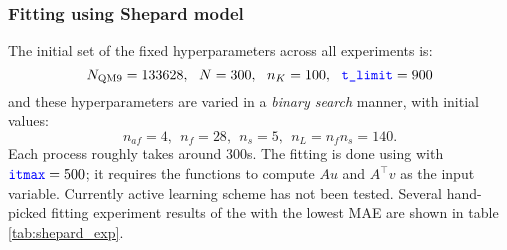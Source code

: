\documentclass[12pt]{article}
\begin{document}
\subsubsection{Fitting using Shepard model}
\label{subsubsec:shepard}
The initial set of the fixed hyperparameters across all experiments is:
\begin{equation*}
	N_\text{QM9} = 133628, ~~ N = 300,~~ n_K = 100, ~~\codeword{t_limit} = 900
\end{equation*}
and these hyperparameters are varied in a \textit{binary search} manner, with initial values:
\begin{equation*}
	n_{af} = 4,~~ n_f = 28, ~~ n_s = 5, ~~ n_L = n_fn_s = 140.
\end{equation*}
Each  process roughly takes around 300s. 
The fitting is done using  with $\codeword{itmax} = 500$; it requires the functions to compute $Au$ and $A^\top v$ as the input variable. 
Currently active learning scheme has not been tested. Several hand-picked fitting experiment results of the with the lowest MAE are shown in table \ref{tab:shepard_exp}.
\end{document}
